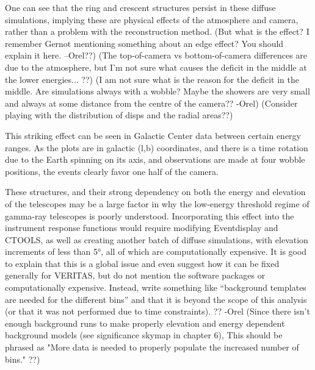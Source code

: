     One can see that the ring and crescent structures persist in these diffuse simulations, implying these are physical effects of the atmosphere and camera, rather than a problem with the reconstruction method.
    {\color{red}(But what is the effect? I remember Gernot mentioning something about an edge effect? You should explain it here. --Orel??)}
    {\color{red}(The top-of-camera vs bottom-of-camera differences are due to the atmosphere, but I'm not sure what causes the deficit in the middle at the lower energies... ??)}
    {\color{red}(I am not sure what is the reason for the deficit in the middle. Are simulations always with a wobble? Maybe the showers are very small and always at some distance from the centre of the camera?? -Orel)}
    {\color{red}(Consider playing with the distribution of disps and the radial areas??)}

    This striking effect can be seen in Galactic Center data between certain energy ranges.
    As the plots are in galactic (l,b) coordinates, and there is a time rotation due to the Earth spinning on its axis, and observations are made at four wobble positions, the events clearly favor one half of the camera.
    
    These structures, and their strong dependency on both the energy and elevation of the telescopes may be a large factor in why the low-energy threshold regime of gamma-ray telescopes is poorly understood.
    Incorporating this effect into the instrument response functions would require modifying Eventdisplay and CTOOLS, as well as creating another batch of diffuse simulations, with elevation increments of less than \ang{5}, all of which are computationally expensive.
    {\color{red}It is good to explain that this is a global issue and even suggest how it can be fixed generally for VERITAS, but do not mention the software packages or computationally expensive. Instead, write something like “background templates are needed for the different bins” and that it is beyond the scope of this analysis (or that it was not performed due to time constraints). ?? -Orel}
    {\color{red}(Since there isn't enough background runs to make properly elevation and energy dependent background models (see significance skymap in chapter 6), This should be phrased as "More data is needed to properly populate the increased number of bins." ??)}
  
  \FloatBarrier

